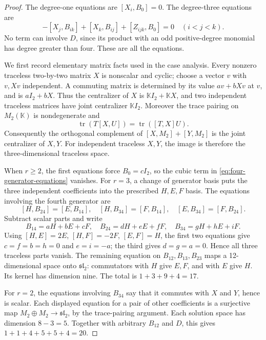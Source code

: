 \begin{proof}
The degree-one equations are \([X_i,B_0]=0\). The degree-three equations are
\begin{equation}
 [X_i,B_{jk}]-[X_j,B_{ik}]+[X_k,B_{ij}]+[Z_{ijk},B_0]=0
 \quad(i<j<k).
 \label{eq:four-generator-equations}
\end{equation}
No term can involve \(D\), since its product with an odd positive-degree monomial has degree greater than four. These are all the equations.

We first record elementary matrix facts used in the case analysis. Every nonzero traceless two-by-two matrix \(X\) is nonscalar and cyclic; choose a vector \(v\) with \(v,Xv\) independent. A commuting matrix is determined by its value \(av+bXv\) at \(v\), and is \(aI_2+bX\). Thus the centralizer of \(X\) is \(\mathbb K I_2+\mathbb K X\), and two independent traceless matrices have joint centralizer \(\mathbb K I_2\). Moreover the trace pairing on \(M_2(\mathbb K)\) is nondegenerate and
\[
 \operatorname{tr}(T[X,U])=\operatorname{tr}([T,X]U).
\]
Consequently the orthogonal complement of \([X,M_2]+[Y,M_2]\) is the joint centralizer of \(X,Y\). For independent traceless \(X,Y\), the image is therefore the three-dimensional traceless space.

When \(r\geq2\), the first equations force \(B_0=cI_2\), so the cubic term in \eqref{eq:four-generator-equations} vanishes. For \(r=3\), a change of generator basis puts the three independent coefficients into the prescribed \(H,E,F\) basis. The equations involving the fourth generator are
\[
 [H,B_{24}]=[E,B_{14}],\quad
 [H,B_{34}]=[F,B_{14}],\quad
 [E,B_{34}]=[F,B_{24}].
\]
Subtract scalar parts and write
\[
 B_{14}=aH+bE+cF,\quad B_{24}=dH+eE+fF,
 \quad B_{34}=gH+hE+iF.
\]
Using \([H,E]=2E\), \([H,F]=-2F\), \([E,F]=H\), the first two equations give \(c=f=b=h=0\) and \(e=i=-a\); the third gives \(d=g=a=0\). Hence all three traceless parts vanish. The remaining equation on \(B_{12},B_{13},B_{23}\) maps a 12-dimensional space onto \(\mathfrak{sl}_2\): commutators with \(H\) give \(E,F\), and with \(E\) give \(H\). Its kernel has dimension nine. The total is \(1+3+9+4=17\).

For \(r=2\), the equations involving \(B_{34}\) say that it commutes with \(X\) and \(Y\), hence is scalar. Each displayed equation for a pair of other coefficients is a surjective map \(M_2\oplus M_2\to\mathfrak{sl}_2\), by the trace-pairing argument. Each solution space has dimension \(8-3=5\). Together with arbitrary \(B_{12}\) and \(D\), this gives \(1+1+4+5+5+4=20\).


\end{proof}
